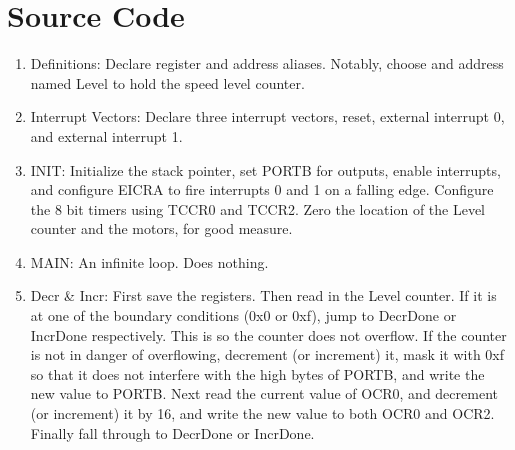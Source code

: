 \documentclass[12pt,letterpaper]{article}
\begin{document}
\section{Source Code}

\begin{enumerate}
\item Definitions: Declare register and address aliases. Notably, choose and address named Level to hold the speed level counter.\\

\item Interrupt Vectors: Declare three interrupt vectors, reset, external interrupt 0, and external interrupt 1.\\

\item INIT: Initialize the stack pointer, set PORTB for outputs, enable interrupts, and configure EICRA to fire interrupts 0 and 1 on a falling edge. Configure the 8 bit timers using TCCR0 and TCCR2. Zero the location of the Level counter and the motors, for good measure.\\

\item MAIN: An infinite loop. Does nothing.\\

\item Decr \& Incr: First save the registers. Then read in the Level counter. If it is at one of the boundary conditions (0x0 or 0xf), jump to DecrDone or IncrDone respectively. This is so the counter does not overflow. If the counter is not in danger of overflowing, decrement (or increment) it, mask it with 0xf so that it does not interfere with the high bytes of PORTB, and write the new value to PORTB. Next read the current value of OCR0, and decrement (or increment) it by 16, and write the new value to both OCR0 and OCR2. Finally fall through to DecrDone or IncrDone.\\
\end{enumerate}
\end{document}
